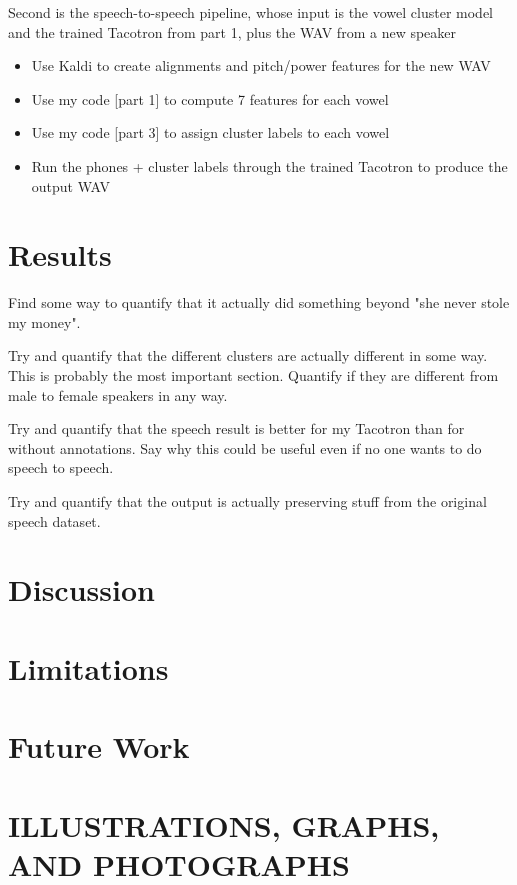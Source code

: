 \documentclass{article}
\begin{document}
Second is the speech-to-speech pipeline, whose input is the vowel cluster model and the trained Tacotron from part 1, plus the WAV from a new speaker

\begin{itemize}
  \item Use Kaldi to create alignments and pitch/power features for the new WAV
  \item Use my code [part 1] to compute 7 features for each vowel
  \item Use my code [part 3] to assign cluster labels to each vowel
  \item Run the phones + cluster labels through the trained Tacotron to produce the output WAV
\end{itemize}

\section{Results}
\label{sec:results}

Find some way to quantify that it actually did something beyond "she never stole my money".

Try and quantify that the different clusters are actually different in some way. This is probably the most important section. Quantify if they are different from male to female speakers in any way.

Try and quantify that the speech result is better for my Tacotron than for without annotations. Say why this could be useful even if no one wants to do speech to speech.

Try and quantify that the output is actually preserving stuff from the original speech dataset.

\section{Discussion}

\section{Limitations}

\section{Future Work}

\section{ILLUSTRATIONS, GRAPHS, AND PHOTOGRAPHS}
\label{sec:illust}
\end{document}
